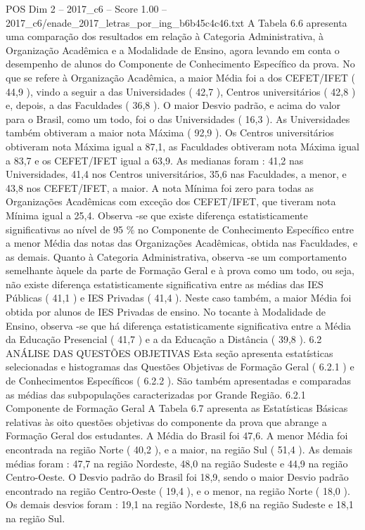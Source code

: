 \begin{textsample}{POS Dim 2 – 2017\_c6 – Score 1.00 – 2017\_c6/enade\_2017\_letras\_por\_ing\_b6b45c4c46.txt}
A Tabela 6.6 apresenta uma comparação dos resultados em relação à Categoria Administrativa, à Organização Acadêmica e a Modalidade de Ensino, agora levando em conta o desempenho de alunos do Componente de Conhecimento Específico da prova.
No que se refere à Organização Acadêmica, a maior Média foi a dos CEFET/IFET ( 44,9 ), vindo a seguir a das Universidades ( 42,7 ), Centros universitários ( 42,8 ) e, depois, a das Faculdades ( 36,8 ).
O maior Desvio padrão, e acima do valor para o Brasil, como um todo, foi o das Universidades ( 16,3 ).
As Universidades também obtiveram a maior nota Máxima ( 92,9 ).
Os Centros universitários obtiveram nota Máxima igual a 87,1, as Faculdades obtiveram nota Máxima igual a 83,7 e os CEFET/IFET igual a 63,9.
As medianas foram : 41,2 nas Universidades, 41,4 nos Centros universitários, 35,6 nas Faculdades, a menor, e 43,8 nos CEFET/IFET, a maior.
A nota Mínima foi zero para todas as Organizações Acadêmicas com exceção dos CEFET/IFET, que tiveram nota Mínima igual a 25,4.
Observa -se que existe diferença estatisticamente significativas ao nível de 95 \% no Componente de Conhecimento Específico entre a menor Média das notas das Organizações Acadêmicas, obtida nas Faculdades, e as demais.
Quanto à Categoria Administrativa, observa -se um comportamento semelhante àquele da parte de Formação Geral e à prova como um todo, ou seja, não existe diferença estatisticamente significativa entre as médias das IES Públicas ( 41,1 ) e IES Privadas ( 41,4 ).
Neste caso também, a maior Média foi obtida por alunos de IES Privadas de ensino.
No tocante à Modalidade de Ensino, observa -se que há diferença estatisticamente significativa entre a Média da Educação Presencial ( 41,7 ) e a da Educação a Distância ( 39,8 ). 6.2 ANÁLISE DAS QUESTÕES OBJETIVAS Esta seção apresenta estatísticas selecionadas e histogramas das Questões Objetivas de Formação Geral ( 6.2.1 ) e de Conhecimentos Específicos ( 6.2.2 ).
São também apresentadas e comparadas as médias das subpopulações caracterizadas por Grande Região. 6.2.1 Componente de Formação Geral A Tabela 6.7 apresenta as Estatísticas Básicas relativas às oito questões objetivas do componente da prova que abrange a Formação Geral dos estudantes.
A Média do Brasil foi 47,6.
A menor Média foi encontrada na região Norte ( 40,2 ), e a maior, na região Sul ( 51,4 ).
As demais médias foram : 47,7 na região Nordeste, 48,0 na região Sudeste e 44,9 na região Centro-Oeste.
O Desvio padrão do Brasil foi 18,9, sendo o maior Desvio padrão encontrado na região Centro-Oeste ( 19,4 ), e o menor, na região Norte ( 18,0 ).
Os demais desvios foram : 19,1 na região Nordeste, 18,6 na região Sudeste e 18,1 na região Sul.

\end{textsample}

